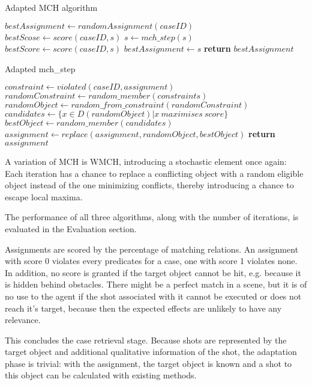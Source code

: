 \begin{algorithm}
    \caption{Adapted MCH algorithm}\label{algo:mch}
    \begin{algorithmic}[1]
        \State $bestAssignment\gets randomAssignment(caseID)$
        \State $bestScose \gets score(caseID, s)$
        \State $s\gets mch\_step(s)$
        \State $bestScore\gets score(caseID, s)$
        \State $bestAssignment\gets s$
        \EndIf
        \EndWhile
        \State \textbf{return} $bestAssignment$
        \EndProcedure
    \end{algorithmic}
\end{algorithm}


\begin{algorithm}
    \caption{Adapted mch\_step}\label{algo:mch_step}
    \begin{algorithmic}[1]
        \State $constraint \gets violated(caseID, assignment)$
        \State $randomConstraint\gets random\_member(constraints)$
        \State $randomObject \gets random\_from\_constraint(randomConstraint)$
        \State $candidates \gets \{x \in D(randomObject) \vert x\ maximises\ score\}$
        \State $bestObject \gets random\_member(candidates)$
        \State $assignment \gets replace(assignment, randomObject, bestObject)$
        \State \textbf{return} $assignment$
        \EndProcedure
    \end{algorithmic}
\end{algorithm}

A variation of \ac{MCH} is \ac{WMCH}, introducing a stochastic element once again: Each iteration has a chance to replace a conflicting object with a random eligible object instead of the one minimizing conflicts, thereby introducing a chance to escape local maxima.\cite{KapKis}

The performance of all three algorithms, along with the number of iterations, is evaluated in the Evaluation section.

Assignments are scored by the percentage of matching relations. An assignment with score 0 violates every predicates for a case, one with score 1 violates none. In addition, no score is granted if the target object cannot be hit, e.g. because it is hidden behind obstacles.
There might be a perfect match in a scene, but it is of no use to the agent if the shot associated with it cannot be executed or does not reach it's target, because then the expected effects are unlikely to have any relevance.

This concludes the case retrieval stage. Because shots are represented by the target object and additional qualitative information of the shot, the adaptation phase is trivial: with the assignment, the target object is known and a shot to this object can be calculated with existing methods.
